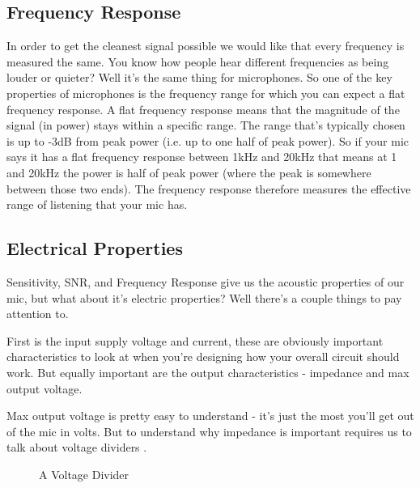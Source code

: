 \documentclass[12pt,a6paper]{book}
\begin{document}
\subsection{Frequency Response}
In order to get the cleanest signal possible we would like that every frequency is measured the same. You know how people hear different frequencies as being louder or quieter? Well it's the same thing for microphones. So one of the key properties of microphones is the frequency range for which you can expect a flat frequency response. A flat frequency response means that the magnitude of the signal (in power) stays within a specific range. The range that's typically chosen is up to -3dB from peak power (i.e. up to one half of peak power). So if your mic says it has a flat frequency response between 1kHz and 20kHz that means at 1 and 20kHz the power is half of peak power (where the peak is somewhere between those two ends). The frequency response therefore measures the effective range of listening that your mic has. 

\subsection{Electrical Properties}
Sensitivity, SNR, and Frequency Response give us the acoustic properties of our mic, but what about it's electric properties? Well there's a couple things to pay attention to.

First is the input supply voltage and current, these are obviously important characteristics to look at when you're designing how your overall circuit should work. But equally important are the output characteristics - impedance and max output voltage. 

Max output voltage is pretty easy to understand - it's just the most you'll get out of the mic in volts. But to understand why impedance is important requires us to talk about voltage dividers \cite{artofelectronics}.

\begin{figure}[!htb]
\caption{\label{fig:my-label} A Voltage Divider}
\end{figure}
\end{document}
